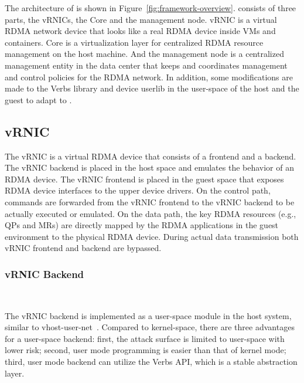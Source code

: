 The architecture of \sys is shown in Figure~\ref{fig:framework-overview}.
\sys consists of three parts, the vRNICs, the \sys Core and the management node. vRNIC is a virtual RDMA network device that looks like a real RDMA device inside VMs and containers. \sys Core is a virtualization layer for centralized RDMA resource management on the host machine. And the management node is a centralized management entity in the data center that keeps and coordinates management and control policies for the RDMA network.
In addition, some modifications are made to the Verbs library and device userlib in the user-space of the host and the guest to adapt to \sys.

\subsection{vRNIC}

The vRNIC is a virtual RDMA device that consists of a frontend and a backend. The vRNIC backend is placed in the host space and emulates the behavior of an RDMA device. The vRNIC frontend is placed in the guest space that exposes RDMA device interfaces to the upper device drivers.
On the control path, commands are forwarded from the vRNIC frontend to the vRNIC backend to be actually executed or emulated.
On the data path, the key RDMA resources (e.g., QPs and MRs) are directly mapped by the RDMA applications in the guest environment to the physical RDMA device. During actual data transmission both vRNIC frontend and backend are bypassed.

\subsubsection{\textbf{vRNIC Backend}}
\
\noindent

The vRNIC backend is implemented as a user-space module in the host system, similar to vhost-user-net~\cite{vhost-user-net}. Compared to kernel-space, there are three advantages for a user-space backend: first, the attack surface is limited to user-space with lower risk; second, user mode programming is easier than that of kernel mode; third, user mode backend can utilize the Verbs API, which is a stable abstraction layer.


